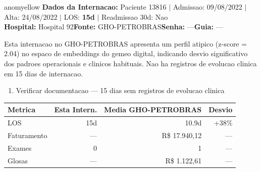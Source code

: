 \documentclass[a4paper,10pt]{article}
\begin{document}
\begin{anomalycard}[Internacao 14919 | GHO-PETROBRAS | MODERADO (z=2.04)]{anomyellow}
\textbf{Dados da Internacao:} Paciente 13816 $\mid$ Admissao: 09/08/2022 $\mid$ Alta: 24/08/2022 $\mid$ LOS: \textbf{15d} $\mid$ Readmissao 30d: Nao\\
\textbf{Hospital:} Hospital 92\quad\textbf{Fonte:} GHO-PETROBRAS\quad\textbf{Senha:} ---\quad\textbf{Guia:} ---\\
\vspace{2pt}\begin{tcolorbox}[colback=severityred!20,colframe=anomyellow,title={\textbf{Interpretacao de Negocio}},fonttitle=\bfseries\small,left=4pt,right=4pt,top=3pt,bottom=3pt]
{\small Esta internacao no GHO-PETROBRAS apresenta um perfil atipico (z-score = 2.04) no espaco de embeddings do gemeo digital, indicando desvio significativo dos padroes operacionais e clinicos habituais. Nao ha registros de evolucao clinica em 15 dias de internacao.}
\end{tcolorbox}
\begin{tcolorbox}[colback=severityyellow!30,colframe=anomorange,title={\textbf{Recomendacoes Especificas}},fonttitle=\bfseries\small,left=4pt,right=4pt,top=3pt,bottom=3pt]
\begin{enumerate}[nosep,leftmargin=16pt]
\item {\small Verificar documentacao --- 15 dias sem registros de evolucao clinica}
\end{enumerate}
\end{tcolorbox}
\begin{center}\begin{tabular}{l r r r}\toprule\textbf{Metrica} & \textbf{Esta Intern.} & \textbf{Media GHO-PETROBRAS} & \textbf{Desvio} \\\midrule
LOS & 15d & 10.9d & +38\% \\
Faturamento & --- & R\$ 17.940,12 & --- \\
Exames & 0 & 1 & --- \\
Glosas & --- & R\$ 1.122,61 & --- \\
\bottomrule\end{tabular}\end{center}


\end{anomalycard}
\end{document}
